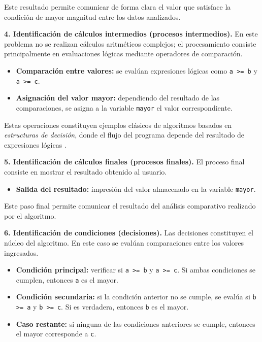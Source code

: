 \documentclass[12pt,twoside]{book}
\begin{document}
						\noindent
						Este resultado permite comunicar de forma clara el valor que satisface la condición de mayor magnitud entre los datos analizados.
						
						\noindent
						\textbf{4. Identificación de cálculos intermedios (procesos intermedios).}
						En este problema no se realizan cálculos aritméticos complejos; el procesamiento consiste principalmente en evaluaciones lógicas mediante operadores de comparación.
						
						\begin{itemize}
							
							\item \textbf{Comparación entre valores:} se evalúan expresiones lógicas como \texttt{a >= b} y \texttt{a >= c}.
							
							\item \textbf{Asignación del valor mayor:} dependiendo del resultado de las comparaciones, se asigna a la variable \texttt{mayor} el valor correspondiente.
							
						\end{itemize}
						
						\noindent
						Estas operaciones constituyen ejemplos clásicos de algoritmos basados en \emph{estructuras de decisión}, donde el flujo del programa depende del resultado de expresiones lógicas \cite{Sebesta2018Concepts}.
						
						\noindent
						\textbf{5. Identificación de cálculos finales (procesos finales).}
						El proceso final consiste en mostrar el resultado obtenido al usuario.
						
						\begin{itemize}
							\item \textbf{Salida del resultado:} impresión del valor almacenado en la variable \texttt{mayor}.
						\end{itemize}
						
						\noindent
						Este paso final permite comunicar el resultado del análisis comparativo realizado por el algoritmo.
						
						\noindent
						\textbf{6. Identificación de condiciones (decisiones).}
						Las decisiones constituyen el núcleo del algoritmo. En este caso se evalúan comparaciones entre los valores ingresados.
						
						\begin{itemize}
							
							\item \textbf{Condición principal:} verificar si \texttt{a >= b} y \texttt{a >= c}. Si ambas condiciones se cumplen, entonces \texttt{a} es el mayor.
							
							\item \textbf{Condición secundaria:} si la condición anterior no se cumple, se evalúa si \texttt{b >= a} y \texttt{b >= c}. Si es verdadera, entonces \texttt{b} es el mayor.
							
							\item \textbf{Caso restante:} si ninguna de las condiciones anteriores se cumple, entonces el mayor corresponde a \texttt{c}.
							
						\end{itemize}
						
\end{document}
